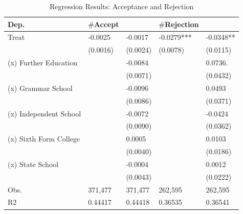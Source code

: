 \begin{table}[ht]
\small
\centering
\caption{Regression Results: Acceptance and Rejection}
\label{tab:regression_acceptance_rejection}
\begin{tabular}{lllll}
\toprule
Dep. & $\#$Accept &  & $\#$Rejection &  \\
\midrule
Treat & -0.0025 & -0.0017 & -0.0279*** & -0.0348** \\
      & (0.0016) & (0.0024) & (0.0078) & (0.0115) \\
 (x) Further Education &  & -0.0084 &  & 0.0736. \\
          &  & (0.0071) &  & (0.0432) \\
 (x) Grammar School &  & -0.0096 &  & 0.0493 \\
          &  & (0.0086) &  & (0.0371) \\
 (x) Independent School &  & -0.0072 &  & -0.0424 \\
          &  & (0.0090) &  & (0.0362) \\
 (x) Sixth Form College &  & 0.0005 &  & 0.0103 \\
          &  & (0.0040) &  & (0.0186) \\
 (x) State School &  & -0.0004 &  & 0.0012 \\
          &  & (0.0043) &  & (0.0222) \\
\midrule
Obs. & 371,477 & 371,477 & 262,595 & 262,595 \\
R2   & 0.44417 & 0.44418 & 0.36535 & 0.36541 \\
\bottomrule
\end{tabular}
\end{table}
